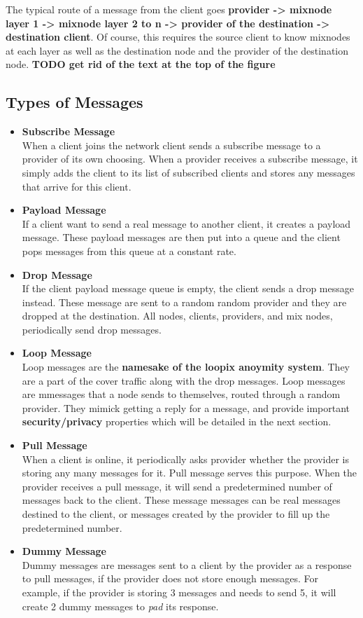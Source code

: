 \documentclass[a4paper,11pt,oneside]{report}
\begin{document}
The typical route of a message from the client goes \textbf{provider -> mixnode layer 1 -> mixnode layer 2 to n -> provider of the destination -> destination client}. Of course, this requires the source client to know mixnodes at each layer as well as the destination node and the provider of the destination node.
\textbf{TODO get rid of the text at the top of the figure}

\subsection{Types of Messages}
\begin{itemize}
    \item \textbf{Subscribe Message} \\
    When a client joins the network client sends a subscribe message to a provider of its own choosing. When a provider receives a subscribe message, it simply adds the client to its list of subscribed clients and stores any messages that arrive for this client.
    \item \textbf{Payload Message} \\
    If a client want to send a real message to another client, it creates a payload message. These payload messages are then put into a queue and the client pops messages from this queue at a constant rate.
    \item \textbf{Drop Message} \\
    If the client payload message queue is empty, the client sends a drop message instead. These message are sent to a random random provider and they are dropped at the destination. All nodes, clients, providers, and mix nodes, periodically send drop messages.
    \item \textbf{Loop Message} \\
    Loop messages are the \textbf{namesake of the loopix anoymity system}. They are a part of the cover traffic along with the drop messages. Loop messages are mmessages that a node sends to themselves, routed through a random provider. They mimick getting a reply for a message, and provide important \textbf{security/privacy} properties which will be detailed in the next section.
    \item \textbf{Pull Message} \\
    When a client is online, it periodically asks provider whether the provider is storing any many messages for it. Pull message serves this purpose. When the provider receives a pull message, it will send a predetermined number of messages back to the client. These message messages can be real messages destined to the client, or messages created by the provider to fill up the predetermined number.
    \item \textbf{Dummy Message} \\
    Dummy messages are messages sent to a client by the provider as a response to pull messages, if the provider does not store enough messages. For example, if the provider is storing 3 messages and needs to send 5, it will create 2 dummy messages to \textit{pad} its response.
\end{itemize}
\end{document}
